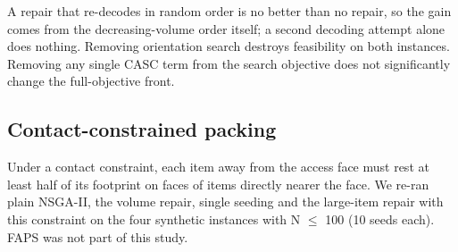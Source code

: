 \documentclass[journal]{IEEEtran}
\begin{document}
\begin{table}[!t]
\caption{Ablation results: HV mean $\pm$ SD, feasible seeds out of 10, and Holm-adjusted p against the full repair.}\label{tab:6}
\centering\footnotesize
{}
\end{table}

A repair that re-decodes in random order is no better than no repair, so the gain comes from the decreasing-volume order itself; a second decoding attempt alone does nothing. Removing orientation search destroys feasibility on both instances. Removing any single CASC term from the search objective does not significantly change the full-objective front.

\subsection{Contact-constrained packing}\label{sec:6.7}

Under a contact constraint, each item away from the access face must rest at least half of its footprint on faces of items directly nearer the face. We re-ran plain NSGA-II, the volume repair, single seeding and the large-item repair with this constraint on the four synthetic instances with N \(\le\) 100 (10 seeds each). FAPS was not part of this study.
\end{document}
